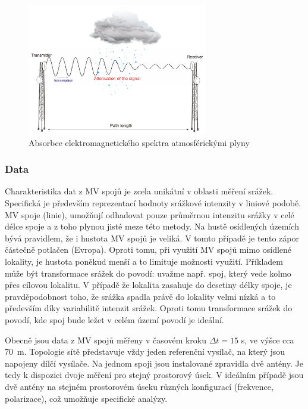 \documentclass[a4paper,12pt,oneside]{report}
\begin{document}
\newpage %
\begin{figure}[h!]
    \centering
    \includegraphics[width=0.7\textwidth]{./img/srazky/microwave_link.png}
    \caption[Rušení radaru]{\centering Absorbce elektromagnetického spektra atmosférickými plyny  \footnotemark }
 \end{figure}   

\subsubsection{Data}
Charakteristika dat z MV spojů je zcela unikátní v oblasti měření
srážek. Specifická je především reprezentací hodnoty srážkové
intenzity v liniové podobě. MV spoje (linie), umožňují odhadovat pouze
průměrnou intenzitu srážky v celé délce spoje a z toho plynou jisté
meze této metody. Na hustě osídlených územích bývá pravidlem, že i
hustota MV spojů je veliká. V tomto případě je tento zápor částečně
potlačen (Evropa). Oproti tomu, při využití MV spojů mimo osídlené
lokality, je hustota poněkud menší a to limituje možnosti
využití. Příkladem může být transformace srážek do povodí: uvažme
např.  spoj, který vede kolmo přes cílovou lokalitu. V případě že
lokalita zasahuje do desetiny délky spoje, je pravděpodobnost toho, že
srážka spadla právě do lokality velmi nízká a to především díky
variabilitě intenzit srážek. Oproti tomu transformace srážek do
povodí, kde spoj bude ležet v celém území povodí je ideální.

Obecně jsou data z MV spojů měřeny v časovém kroku $\Delta t=15$ s,
ve výšce cca 70~m. Topologie sítě představuje vždy jeden
referenční vysílač, na který jsou napojeny dílčí vysílače. Na jednom
spoji jsou instalované zpravidla dvě antény. Je tedy k dispozici
dvoje měření pro stejný prostorový úsek. V ideálním případě jsou dvě
antény na stejném prostorovém úseku různých konfigurací (frekvence,
polarizace), což umožňuje specifické analýzy.
\end{document}
